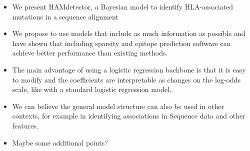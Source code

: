 \documentclass[fleqn,11pt]{SelfArx} %
\begin{document}
\begin{itemize}
  \item We present HAMdetector, a Bayesian model to identify HLA-associated mutations in a sequence alignment
  \item We propose to use models that include as much information as possible and have shown that including sparsity and epitope prediction software can achieve better performance than existing methods.
  \item The main advantage of using a logistic regression backbone is that it is easy to modify and the coefficients are interpretable as changes on the log-odds scale, like with a standard logistic regression model.
  \item We can believe the general model structure can also be used in other contexts, for example in identifying associations in Sequence data and other features.
  \item Maybe some additional points?
\end{itemize}
\thispagestyle{empty} %


\FloatBarrier



\end{document}
